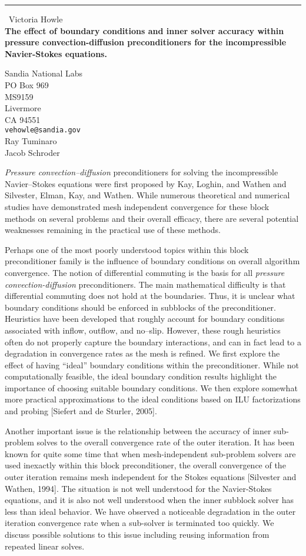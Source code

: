 \documentclass{report}
\begin{document}
\begin{center}
\rule{6in}{1pt} \
{\large Victoria Howle \\
{\bf The effect of boundary conditions and inner solver accuracy within pressure convection-diffusion preconditioners for the incompressible Navier-Stokes equations.}}

Sandia National Labs \\ PO Box 969 \\ MS9159 \\ Livermore \\ CA 94551
\\
{\tt vehowle@sandia.gov}\\
Ray Tuminaro\\
Jacob Schroder\end{center}

{\it Pressure convection--diffusion} preconditioners for solving the
incompressible Navier--Stokes equations were first proposed by Kay,
Loghin, and Wathen and Silvester, Elman, Kay, and Wathen. While numerous
theoretical and numerical studies have demonstrated mesh independent
convergence for these block methods on several problems and their overall
efficacy, there are several potential weaknesses remaining in the
practical use of these methods.

Perhaps one of the most poorly understood topics within this block
preconditioner family is the influence of boundary conditions on
overall algorithm convergence. The notion of differential commuting is
the basis for all {\it pressure convection-diffusion} preconditioners.
The main mathematical difficulty is that differential commuting does not
hold at the boundaries. Thus, it is unclear what boundary conditions
should be enforced in subblocks of the preconditioner. Heuristics have
been developed that roughly account for boundary conditions associated
with inflow, outflow, and no--slip. However, these rough heuristics often
do not properly capture the boundary interactions, and can in fact lead
to a degradation in convergence rates as the mesh is refined. We first
explore the effect of having ``ideal'' boundary conditions within the
preconditioner. While not computationally feasible, the ideal boundary
condition results highlight the importance of choosing suitable boundary
conditions. We then explore somewhat more practical approximations to the
ideal conditions based on ILU factorizations and probing [Siefert and de
Sturler, 2005].

Another important issue is the relationship between the accuracy of
inner sub-problem solves to the overall convergence rate of the outer
iteration. It has been known for quite some time that when
mesh-independent sub-problem solvers are used inexactly within this
block preconditioner, the overall convergence of the outer iteration
remains mesh independent for the Stokes equations [Silvester and Wathen,
1994]. The situation is not well understood for the Navier-Stokes
equations, and it is also not well understood when the inner subblock
solver has less than ideal behavior. We have observed a noticeable
degradation in the outer iteration convergence rate when a sub-solver is
terminated too quickly. We discuss possible solutions to this issue
including reusing information from repeated linear solves.
\end{document}
